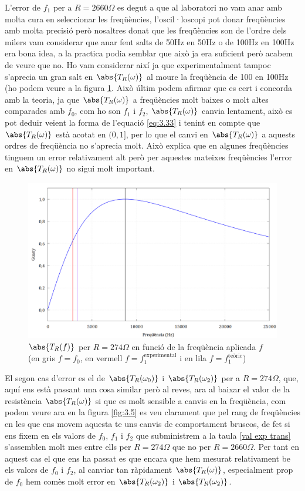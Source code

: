 \documentclass[a4paper,10.5pt]{report}
\begin{document}
L'error de $f_1$ per a $R = 2660\Omega$ es degut a que al laboratori no vam anar amb molta cura en seleccionar les freqüències, l'oscil·loscopi pot donar freqüències amb molta precisió però nosaltres donat que les freqüències son de l'ordre dels milers vam considerar que anar fent salts de 50Hz en 50Hz o de 100Hz en 100Hz era bona idea, a la practica podia semblar que això ja era suficient però acabem de veure que no. Ho vam considerar així ja que experimentalment tampoc s'aprecia un gran salt en $\abs{T_R(\omega)}$ al moure la freqüència de 100 en 100Hz (ho podem veure a la figura \ref{fig:3.4}. Això últim podem afirmar que es cert i concorda amb la teoria, ja que $\abs{T_R(\omega)}$ a freqüències molt baixes o molt altes comparades amb $f_0$, com ho son $f_1$ i $f_2$, $\abs{T_R(\omega)}$ canvia lentament, això es pot deduir veient la forma de l'equació \ref{eq:3.33} i tenint en compte que $\abs{T_R(\omega)}$ està acotat en $(0,1]$, per lo que el canvi en $\abs{T_R(\omega)}$ a aquests ordres de freqüència no s'aprecia molt. Això explica que en algunes freqüències tinguem un error relativament alt però per aquestes mateixes freqüències l'error en $\abs{T_R(\omega)}$ no sigui molt important. 

\begin{figure}[H]
	\centering
	\includegraphics[width=0.6\linewidth]{R2660.png}
	\caption{$\abs{T_R(f)}$ per $R = 274\Omega$ en funció de  la freqüència aplicada $f$ (en gris $f=f_0$, en vermell $f=f_1^{\text{experimental}}$ i en lila $f=f_1^{\text{teòric}}$)}
	\label{fig:3.4}
\end{figure}

El segon cas d'error es el de $\abs{T_R(\omega_0)}$ i $\abs{T_R(\omega_2)}$ per a $R = 274\Omega$, que, aquí ens està passant una cosa similar però al reves, ara al baixar el valor de la resistència $\abs{T_R(\omega)}$ si que es molt sensible a canvis en la freqüència, com podem veure ara en la figura \ref{fig:3.5} es veu clarament que pel rang de freqüències en les que ens movem aquesta te uns canvis de comportament bruscos, de fet si ens fixem en els valors de $f_0$, $f_1$ i $f_2$ que subministrem a la taula \ref{val exp trans} s'assemblen molt mes entre ells per $R = 274\Omega$ que no per $R = 2660\Omega$. Per tant en aquest cas el que ens ha passat es que encara que hem mesurat relativament be els valors de $f_0$ i $f_2$, al canviar tan ràpidament $\abs{T_R(\omega)}$, especialment prop de $f_0$ hem comès molt error en $\abs{T_R(\omega_2)}$ i $\abs{T_R(\omega_2)}$.
\end{document}
